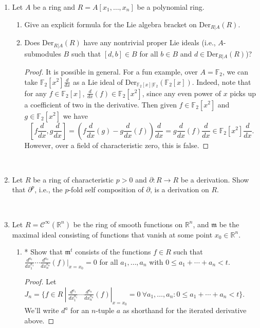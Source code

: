 \documentclass{amsart}[12pt]
\newcommand{\R}{{\mathbb{R}}}
\newcommand{\fm}{{\mathfrak m}}
\numberwithin{equation}{section}
\theoremstyle{plain} %
\theoremstyle{definition}
\theoremstyle{remark}
\newcommand{\Der}{\mathrm{Der}}
\begin{document}
\begin{enumerate}
\item Let $A$ be a ring and $R=A[x_1,\dots,x_n]$ be a polynomial ring.
\begin{enumerate}
\item Give an explicit formula for the Lie algebra bracket on $\Der_{R|A}(R)$.
\item Does $\Der_{R|A}(R)$ have any nontrivial proper Lie ideals (i.e., $A$-submodules $B$ such that $[d,b]\in B$ for all $b\in B$ and $d\in \Der_{R|A}(R)$)?
\begin{proof}
It is possible in general. For a fun example, over $A=\mathbb{F}_2$, we can take $\mathbb{F}_2[x^2] \frac{d}{dx}$ as a Lie ideal of $\Der_{\mathbb{F}_2[x]|\mathbb{F}_2}(\mathbb{F}_2[x])$. Indeed, note that for any $f\in \mathbb{F}_2[x]$, $\frac{d}{dx}(f) \in \mathbb{F}_2[x^2]$, since any even power of $x$ picks up a coefficient of two in the derivative. Then given $f\in \mathbb{F}_2[x^2]$ and $g\in \mathbb{F}_2[x^2]$ we have \[ [f\frac{d}{dx}, g \frac{d}{dx}] = (f \frac{d}{dx}(g) - g \frac{d}{dx}(f)) \frac{d}{dx} =g \frac{d}{dx}(f) \frac{d}{dx} \in \mathbb{F}_2[x^2] \frac{d}{dx}.\]
However, over a field of characteristic zero, this is false.
\end{proof}
\end{enumerate}


\


\item Let $R$ be a ring of characteristic $p>0$ and $\partial:R\to R$ be a derivation. Show that $\partial^p$, i.e., the $p$-fold self composition of $\partial$, is a derivation on $R$.

\

\item Let $R=\mathcal{C}^\infty(\R^n)$ be the ring of smooth functions on $\R^n$, and $\fm$ be the maximal ideal consisting of functions that vanish at some point $x_0\in \R^n$.
\begin{enumerate}
\item * Show that $\fm^t$ consists of the functions $f\in R$ such that $\frac{d^{a_1}}{dx_1^{a_1}} \cdots \frac{d^{a_n}}{dx_n^{a_n}}(f)|_{x=x_0} = 0$ for all $a_1,\dots,a_n$ with $0
\leq a_1+\cdots+a_n<t$.
\begin{proof}
Let $J_n= \{ f\in R \ | \ \frac{d^{a_1}}{dx_1^{a_1}} \cdots \frac{d^{a_n}}{dx_n^{a_n}}(f)|_{x=x_0} = 0\ \forall a_1,\dots,a_n:0
\leq a_1+\cdots+a_n<t\}$. We'll write $d^a$ for an $n$-tuple $a$ as shorthand for the iterated derivative above. 


\end{proof}
\end{enumerate}
\end{enumerate}
\end{document}
